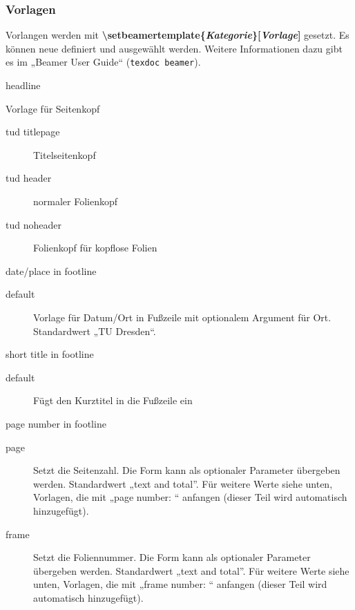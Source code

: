 \documentclass[presentation,t]{beamer}
\begin{document}
\begin{frame}[allowframebreaks]
\frametitle{Vorlagen}
\label{sec-2-2-4}

Vorlangen werden mit 
\textbf{\textbackslash setbeamertemplate\{\emph{Kategorie}\}[\emph{Vorlage}]} 
gesetzt. Es können neue
definiert und ausgewählt werden. Weitere Informationen dazu gibt es im
„Beamer User Guide“ (\texttt{texdoc beamer}).
\begin{block}{headline}
\label{sec-2-2-4-1}

Vorlage für Seitenkopf
\begin{description}
\item[tud titlepage] Titelseitenkopf
\item[tud header] normaler Folienkopf
\item[tud noheader] Folienkopf für kopflose Folien
\end{description}
\end{block}
\begin{block}{date/place in footline}
\label{sec-2-2-4-2}


\begin{description}
\item[default] Vorlage für Datum/Ort in Fußzeile mit optionalem Argument
 für Ort. Standardwert „TU Dresden“.
\end{description}
\end{block}
\begin{block}{short title in footline}
\label{sec-2-2-4-3}


\begin{description}
\item[default] Fügt den Kurztitel in die Fußzeile ein
\end{description}
\end{block}
\begin{block}{page number in footline}
\label{sec-2-2-4-4}

\small
\begin{description}
\item[page] Setzt die Seitenzahl. Die Form kann als optionaler Parameter
 übergeben werden. Standardwert „text and total''. Für weitere Werte
 siehe unten, Vorlagen, die mit „page number: “ anfangen (dieser Teil
 wird automatisch hinzugefügt).
\item[frame] Setzt die Foliennummer. Die Form kann als optionaler Parameter
 übergeben werden. Standardwert „text and total''. Für weitere Werte
 siehe unten, Vorlagen, die mit „frame number: “ anfangen (dieser Teil
 wird automatisch hinzugefügt).
\end{description}
\end{block}
\end{frame}
\end{document}
